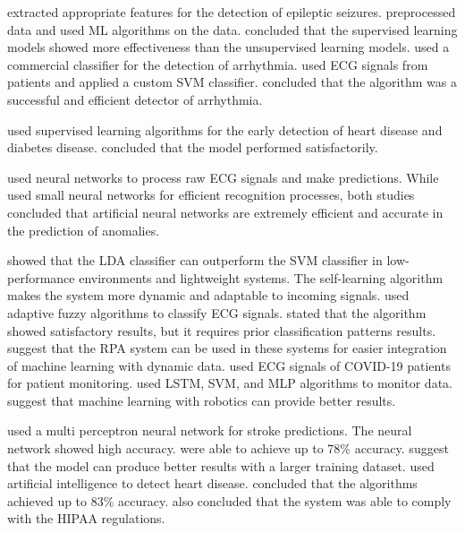 \cite*{23_rp} extracted appropriate features for the detection of epileptic seizures. \citeauthor{23_rp} preprocessed data and used ML algorithms on the data. \citeauthor{23_rp} concluded that the supervised learning models showed more effectiveness than the unsupervised learning models. \cite*{12_rp} used a commercial classifier for the detection of arrhythmia. \citeauthor{12_rp} used ECG signals from patients and applied a custom SVM classifier. \citeauthor{12_rp} concluded that the algorithm was a successful and efficient {\responsemod detector} of arrhythmia.

\cite*{ref_paper_m2} used supervised learning algorithms for the early detection of heart disease and diabetes disease. \cite*{ref_paper_m2} concluded that the model performed satisfactorily.

\cite*{09_rp} used neural networks to process raw ECG signals and make predictions. {\responsemod While \cite*{22_rp} used small neural networks for efficient recognition processes, both studies concluded that artificial neural networks are extremely efficient and accurate in the prediction of anomalies.}

\cite*{06_rp} showed that the LDA classifier can outperform the SVM classifier in low-performance environments and lightweight systems. The self-learning algorithm makes the system more dynamic and adaptable to incoming signals. \cite*{14_rp} used adaptive fuzzy algorithms to classify ECG signals. \citeauthor{14_rp} stated that the algorithm showed satisfactory results, but it requires {\responsemod prior} classification patterns results. \cite*{ref_paper_self_rpa} suggest that the RPA system can be used in these systems for easier integration of machine learning with dynamic data. \cite*{21_rp} used ECG signals of COVID-19 patients for patient monitoring. \citeauthor{21_rp} used LSTM, SVM, and MLP algorithms to monitor data. \citeauthor{21_rp} suggest that machine learning with robotics can provide better results.

\cite*{07_rp} used a multi perceptron neural network for stroke predictions. The neural network showed high accuracy. \citeauthor{07_rp} were able to achieve up to 78\% accuracy. \citeauthor{07_rp} suggest that the model can produce better results with a larger training dataset. \cite*{05_rp} used artificial intelligence to detect heart disease. \citeauthor{05_rp} concluded that the algorithms achieved up to 83\% accuracy. \citeauthor{05_rp} also concluded that the system was able to comply with the HIPAA regulations.

